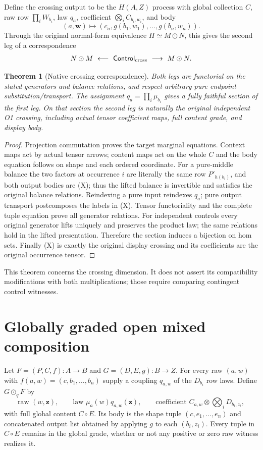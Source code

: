 \documentclass[11pt]{article}
\newtheorem{theorem}{Theorem}\newtheorem{proposition}[theorem]{Proposition}
\begin{document}
Define the crossing output to be the $H(A,Z)$ process with global collection $C$, raw row $\prod_iW_{b_i}$, law $q_a$, coefficient $\bigotimes_iC_{b_i,w_i}$, and body
\[
 (a,\mathbf w)\longmapsto(c_a,g(b_1,w_1),\ldots,g(b_n,w_n)).\tag{X}
\]
Through the original normal-form equivalence $H\simeq M\odot N$, this gives the second leg of a correspondence
\[
 N\odot M\ \longleftarrow\ \mathsf{Control}_{\rm cross}\
 \longrightarrow\ M\odot N.
\]

\begin{theorem}[Native crossing correspondence]
Both legs are functorial on the stated generators and balance relations, and respect arbitrary pure endpoint substitution/transport. The assignment $q_a=\prod_i\mu_{b_i}$ gives a fully faithful section of the first leg. On that section the second leg is naturally the original independent O1 crossing, including actual tensor coefficient maps, full content grade, and display body.
\end{theorem}
\begin{proof}
Projection commutation proves the target marginal equations. Context maps act by actual tensor arrows; content maps act on the whole $C$ and the body equation follows on shape and each ordered coordinate. For a pure-middle balance the two factors at occurrence $i$ are literally the same row $P'_{h(b_i)}$, and both output bodies are (X); thus the lifted balance is invertible and satisfies the original balance relations. Reindexing a pure input reindexes $q_a$; pure output transport postcomposes the labels in (X). Tensor functoriality and the complete tuple equation prove all generator relations. For independent controls every original generator lifts uniquely and preserves the product law; the same relations hold in the lifted presentation. Therefore the section induces a bijection on hom sets. Finally (X) is exactly the original display crossing and its coefficients are the original occurrence tensor.\end{proof}
This theorem concerns the crossing dimension. It does not assert its compatibility modifications with both multiplications; those require comparing contingent control witnesses.

\section{Globally graded open mixed composition}
Let $F=(P,C,f):A\to B$ and $G=(D,E,g):B\to Z$. For every raw $(a,w)$ with $f(a,w)=(c,b_1,\ldots,b_n)$ supply a coupling $q_{a,w}$ of the $D_{b_i}$ row laws. Define $G\mathbin{\odot_q}F$ by
\[
 \text{raw }(w,\mathbf z),\qquad
 \text{law }\mu_a(w)q_{a,w}(\mathbf z),\qquad
 \text{coefficient }C_{a,w}\otimes\bigotimes_iD_{b_i,z_i},
\]
with full global content $C\circ E$. Its body is the shape tuple $(c,e_1,\ldots,e_n)$ and concatenated output list obtained by applying $g$ to each $(b_i,z_i)$. Every tuple in $C\circ E$ remains in the global grade, whether or not any positive or zero raw witness realizes it.
\end{document}
